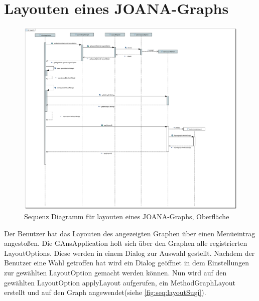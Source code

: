 \section{Layouten eines JOANA-Graphs}
\begin{figure}[!htbp]
	\centering
	\includegraphics[width=450pt]{resourcen/SeqDiagramLayout.PDF}
	\caption{Sequenz Diagramm für layouten eines JOANA-Graphs, Oberfläche}
	\label{fig:seq:layout}
\end{figure}

Der Benutzer hat das Layouten des angezeigten Graphen über einen Menüeintrag angestoßen. Die GAnsApplication holt sich über den Graphen alle registrierten LayoutOptions. Diese werden in einem Dialog zur Auswahl gestellt. Nachdem der Benutzer eine Wahl getroffen hat wird ein Dialog geöffnet in dem Einstellungen zur gewählten LayoutOption gemacht werden können. Nun wird auf den gewählten LayoutOption applyLayout aufgerufen, ein MethodGraphLayout erstellt und auf den Graph angewendet(siehe \ref{fig:seq:layoutSugi}).
\newpage

